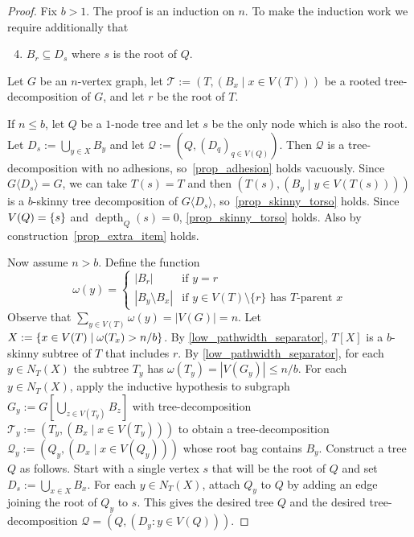 \documentclass{patmorin}
\renewcommand{\le}{\leqslant}
\newcommand{\torso}[2]{{#1}\langle{#2}\rangle}
\DeclareMathOperator{\depth}{depth}
\DeclarePairedDelimiter{\set}{\{}{\}}
\begin{document}
  \begin{proof}
    Fix $b>1$.
    The proof is an induction on $n$.
    To make the induction work we require additionally that
    \begin{enumerate}[nosep,nolistsep,label=\rm(\alph*)]
    \setcounter{enumi}{3}
    \item\label{prop_extra_item} $B_r \subseteq D_s$ where $s$ is the root of $Q$.
    \end{enumerate}
    Let $G$ be an $n$-vertex graph, let $\mathcal{T}:=(T,(B_x\mid x\in V(T)))$ be a rooted tree-decomposition of $G$, and let $r$ be the root of $T$.

If $n\le b$, let $Q$ be a $1$-node tree and let $s$ be the only node which is also the root.
Let $D_s:=\bigcup_{y\in X} B_y$ and let $\mathcal{Q}:=(Q,(D_q)_{q\in V(Q)})$.
Then $\mathcal{Q}$ is a tree-decomposition with no adhesions, so~\ref{prop_adhesion} holds vacuously.
Since $\torso{G}{D_s}=G$, we can take $T(s)=T$ and then $(T(s),(B_y\mid y\in V(T(s))))$ is a $b$-skinny tree decomposition of $\torso{G}{D_s}$,
so~\ref{prop_skinny_torso} holds.
Since $V(Q)=\set{s}$ and $\depth_Q(s)=0$, \ref{prop_skinny_torso}  holds.
Also by construction~\ref{prop_extra_item} holds.

    Now assume $n> b$.  Define the function
    \[
        \omega(y) = \begin{cases}
        |B_r| & \text{if $y=r$} \\
        |B_y\setminus B_x| & \text{if $y\in V(T)\setminus\{r\}$ has $T$-parent $x$}
        \end{cases}
    \]
    Observe that $\sum_{y\in V(T)}\omega(y)=|V(G)|=n$.
    Let $X:=\set{x\in V(T)\mid  \omega(T_x)>n/b}$.
    By \cref{low_pathwidth_separator}, $T[X]$ is a $b$-skinny subtree of $T$ that includes $r$.
    By \cref{low_pathwidth_separator}, for each $y\in N_T(X)$ the subtree $T_y$ has $\omega(T_y)=|V(G_y)|\le n/b$. For each $y\in N_T(X)$, apply the inductive hypothesis to subgraph $G_y:=G[\bigcup_{z\in V(T_y)} B_z]$ with tree-decomposition $\mathcal{T}_y:=(T_y, (B_x\mid x\in V(T_y)))$ to obtain a tree-decomposition $\mathcal{Q}_{y}:=(Q_y,(D_x \mid x\in V(Q_y)))$ whose root bag contains $B_y$.
    Construct a tree $Q$ as follows.
    Start with a single vertex $s$ that will be the root of $Q$ and set $D_s:=\bigcup_{x\in X} B_x$.
    For each $y\in N_T(X)$, attach $Q_y$ to $Q$ by adding an edge joining the root of $Q_y$ to $s$.
    This gives the desired tree $Q$ and the desired tree-decomposition $\mathcal{Q}=(Q,(D_y:y\in V(Q)))$.


\end{proof}
\end{document}
